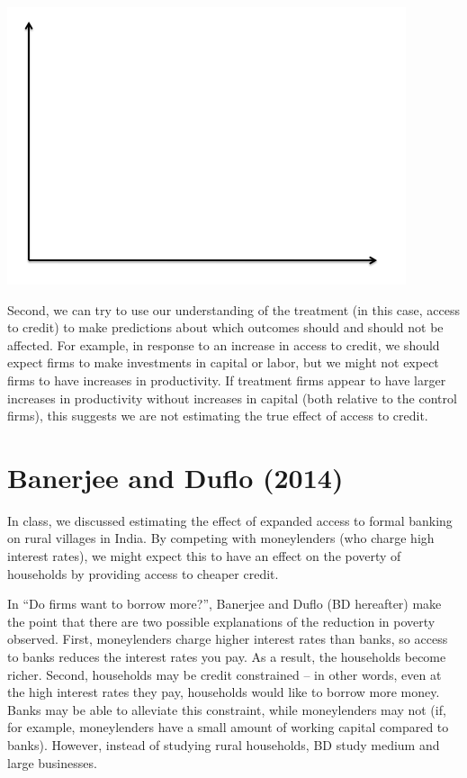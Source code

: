 \documentclass[12pt,english]{article}
\begin{document}
\begin{center}
	\begin{adjustbox}{
			max width=0.65\textwidth,
		}
		\includegraphics{axes.png}
	\end{adjustbox}
\end{center}

Second, we can try to use our understanding of the treatment (in this case, access to credit) to make predictions about which outcomes should and should not be affected. For example, in response to an increase in access to credit, we should expect firms to make investments in capital or labor, but we might not expect firms to have increases in productivity. If treatment firms appear to have larger increases in productivity without increases in capital (both relative to the control firms), this suggests we are not estimating the true effect of access to credit.

\section{Banerjee and Duflo (2014)}

In class, we discussed estimating the effect of expanded access to formal banking on rural villages in India. By competing with moneylenders (who charge high interest rates), we might expect this to have an effect on the poverty of households by providing access to cheaper credit.

In ``Do firms want to borrow more?'', Banerjee and Duflo (BD hereafter) make the point that there are two possible explanations of the reduction in poverty observed. First, moneylenders charge higher interest rates than banks, so access to banks reduces the interest rates you pay. As a result, the households become richer. Second, households may be credit constrained -- in other words, even at the high interest rates they pay, households would like to borrow more money. Banks may be able to alleviate this constraint, while moneylenders may not (if, for example, moneylenders have a small amount of working capital compared to banks). However, instead of studying rural households, BD study medium and large businesses.
\end{document}
